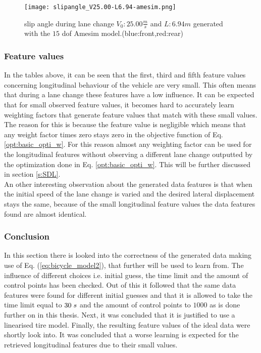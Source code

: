  \begin{figure}[h!]
	\centering
	\texttt{[image: slipangle\_V25.00-L6.94-amesim.png]}
	\caption{slip angle during lane change $V_0: 25.00 \frac{m}{s}$ and $L:6.94 m$ generated with the $15$ dof Amesim model.(blue:front,red:rear)}
	\label{fig:slip}
\end{figure}


\subsubsection{Feature values} \label{s:fv_val}
In the tables above, it can be seen that the first, third and fifth feature values concerning longitudinal behaviour of the vehicle are very small. This often means that during a lane change these features have a low influence. It can be expected that for small observed feature values, it becomes hard to accurately learn weighting factors that generate feature values that match with these small values. The reason for this is because the feature value is negligible which means that any weight factor times zero stays zero in the objective function of Eq. \ref{opt:basic_opti_w}. For this reason almost any weighting factor can be used for the longitudinal features without observing a different lane change outputted by the optimization done in Eq. \ref{opt:basic_opti_w}. This will be further discussed in section \ref{s:SDL}.\\%

An other interesting observation about the generated data features is that when the initial speed of the lane change is varied and the desired lateral displacement stays the same, because of the small longitudinal feature values the data features found are almost identical. 

\subsubsection{Conclusion}
In this section there is looked into the correctness of the generated data making use of Eq. (\ref{eq:bicycle_model2}), that further will be used to learn from. The influence of different choices i.e. initial guess, the time limit and the amount of control points has been checked. Out of this it followed that the same data features were found for different initial guesses and that it is allowed to take the time limit equal to $30 \hspace{1mm}s$ and the amount of control points to $1000$ as is done further on in this thesis. Next, it was concluded that it is justified to use a linearised tire model. Finally, the resulting feature values of the ideal data were shortly look into. It was concluded that a worse learning is expected for the retrieved longitudinal features due to their small values. 

